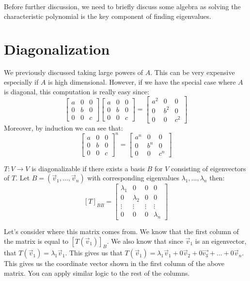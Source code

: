 Before further discussion, we need to briefly discuss some algebra as solving the characteristic polynomial is the key component of finding eigenvalues.
\section{Diagonalization}
We previously discussed taking large powers of $A$. This can be very expensive especially if $A$ is high dimensional. However, if we have the special case where $A$ is diagonal, this computation is really easy since:
$$\begin{bmatrix}
    a & 0 & 0\\
    0 & b & 0\\
    0 & 0 & c
\end{bmatrix}\begin{bmatrix}
    a & 0 & 0\\
    0 & b & 0\\
    0 & 0 & c
\end{bmatrix}=\begin{bmatrix}
    a^2 & 0 & 0\\
    0 & b^2 & 0\\
    0 & 0 & c^2
\end{bmatrix}$$
Moreover, by induction we can see that:
$$\begin{bmatrix}
    a & 0 & 0\\
    0 & b & 0\\
    0 & 0 & c
\end{bmatrix}^n=\begin{bmatrix}
    a^n & 0 & 0\\
    0 & b^n & 0\\
    0 & 0 & c^n
\end{bmatrix}$$
\begin{definition}
    $T:V\to V$ is diagonalizable if there exists a basis $B$ for $V$ consisting of eigenvectors of $T$. Let $B=(\vec{v}_1,\ldots,\vec{v}_n)$ with corresponding eigenvalues $\lambda_1,\ldots,\lambda_n$ then:
    $$[T]_{BB}=\begin{bmatrix}
        \lambda_1 & 0 & 0 & 0\\
        0 & \lambda_2 & 0 & 0\\
        \vdots & \vdots & \vdots & \vdots\\
        0 & 0 & 0 & \lambda_n
    \end{bmatrix}$$
\end{definition}
Let's consider where this matrix comes from. We know that the first column of the matrix is equal to $[T(\vec{v}_1)]_B$. We also know that since $\vec{v}_1$ is an eigenvector, that $T(\vec{v}_1)=\lambda_1\vec{v}_1$. This gives us that $T(\vec{v}_1)=\lambda_1\vec{v}_1+0\vec{v}_2+0\vec{v_3}+\ldots+0\vec{v}_n$. This gives us the coordinate vector shown in the first column of the above matrix. You can apply similar logic to the rest of the columns.

